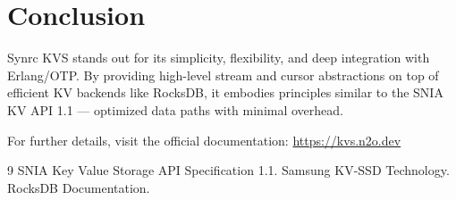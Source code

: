 \documentclass[11pt,a4paper]{article}
\begin{document}
\section{Conclusion}

Synrc KVS stands out for its simplicity, flexibility, and deep integration with Erlang/OTP. By providing high-level stream and cursor abstractions on top of efficient KV backends like RocksDB, it embodies principles similar to the SNIA KV API 1.1 — optimized data paths with minimal overhead.

For further details, visit the official documentation: \url{https://kvs.n2o.dev}


\begin{thebibliography}{9}
 SNIA Key Value Storage API Specification 1.1.
 Samsung KV-SSD Technology.
 RocksDB Documentation.
\end{thebibliography}
\end{document}
